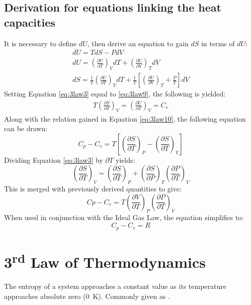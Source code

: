 \documentclass[10pt, oneside, twocolumn]{article}
\numberwithin{equation}{section}
\begin{document}
		\subsection{Derivation for equations linking the heat capacities}
			It is necessary to define $dU$, then derive an equation to gain $dS$ in terms of $dU$: 
			\begin{gather}
			dU=TdS-PdV\\
			dU={\left(\frac{\partial U}{\partial T}\right)}_VdT+{\left(\frac{\partial U}{\partial V}\right)}_TdV\\
			dS=\frac{1}{T}{\left(\frac{\partial U}{\partial T}\right)}_VdT+\frac{1}{T}\left[{\left(\frac{\partial U}{\partial V}\right)}_T+\frac{P}{T}\right]dV \label{eq:3law9}
			\end{gather}
			Setting Equation \ref{eq:3law3} equal to \ref{eq:3law9}, the following is yielded:
			\begin{gather}
			T{\left(\frac{\partial S}{\partial T}\right)}_V={\left(\frac{\partial U}{\partial T}\right)}_V=C_v
			\end{gather}
			Along with the relation gained in Equation \ref{eq:3law10}, the following equation can be drawn:
			\begin{equation}
			C_p-C_v=T\left[{\left(\frac{\partial S}{\partial T}\right)}_P-{\left(\frac{\partial S}{\partial T}\right)}_V\right]
			\end{equation}
			Dividing Equation \ref{eq:3law3} by $\partial T$ yields:
			\begin{equation}
			{\left(\frac{\partial S}{\partial T}\right)}_V={\left(\frac{\partial S}{\partial T}\right)}_P+{\left(\frac{\partial S}{\partial P}\right)}_T{\left(\frac{\partial P}{\partial T}\right)}_V
			\end{equation}
			This is merged with previously derived quantities to give:
			\begin{equation}
			Cp-C_v=T{\left(\frac{\partial V}{\partial T}\right)}_P{\left(\frac{\partial P}{\partial T}\right)}_V
			\end{equation}
			When used in conjunction with the Ideal Gas Law, the equation simplifies to:
			\begin{equation}
			C_p-C_v=R
			\end{equation}
	\section{3\textsuperscript{rd} Law of Thermodynamics}
		The entropy of a system approaches a constant value as its temperature approaches absolute zero (\SI{0}{\kelvin}). Commonly given as .
\end{document}
